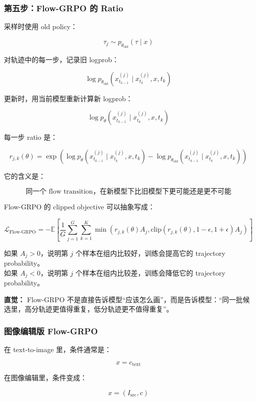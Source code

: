 \subsubsection{第五步：Flow-GRPO 的 Ratio}

采样时使用 old policy：

\[
\tau_j\sim p_{\theta_\text{old}}(\tau\mid x)
\]

对轨迹中的每一步，记录旧 logprob：

\[
\log p_{\theta_\text{old}}
\left(
x_{t_{k-1}}^{(j)}
\mid
x_{t_k}^{(j)},x,t_k
\right)
\]

更新时，用当前模型重新计算新 logprob：

\[
\log p_\theta
\left(
x_{t_{k-1}}^{(j)}
\mid
x_{t_k}^{(j)},x,t_k
\right)
\]

每一步 ratio 是：

\[
r_{j,k}(\theta)
=
\exp
\left(
\log p_\theta
\left(
x_{t_{k-1}}^{(j)}
\mid
x_{t_k}^{(j)},x,t_k
\right)
-
\log p_{\theta_\text{old}}
\left(
x_{t_{k-1}}^{(j)}
\mid
x_{t_k}^{(j)},x,t_k
\right)
\right)
\]

它的含义是：

\[
\text{同一个 flow transition，在新模型下比旧模型下更可能还是更不可能}
\]

Flow-GRPO 的 clipped objective 可以抽象写成：

\[
\mathcal{L}_\text{Flow-GRPO}
=
-
\mathbb{E}
\left[
\frac{1}{G}
\sum_{j=1}^{G}
\sum_{k=1}^{K}
\min
\left(
r_{j,k}(\theta)A_j,
\text{clip}(r_{j,k}(\theta),1-\epsilon,1+\epsilon)A_j
\right)
\right]
\]

如果 $A_j>0$，说明第 $j$ 个样本在组内比较好，训练会提高它的 trajectory probability。\\
如果 $A_j<0$，说明第 $j$ 个样本在组内比较差，训练会降低它的 trajectory probability。

\begin{intubox}
\textbf{直觉：} Flow-GRPO 不是直接告诉模型“应该怎么画”，而是告诉模型：“同一批候选里，高分轨迹更值得重复，低分轨迹更不值得重复”。
\end{intubox}

\subsubsection{图像编辑版 Flow-GRPO}

在 text-to-image 里，条件通常是：

\[
x=c_\text{text}
\]

在图像编辑里，条件变成：

\[
x=(I_\text{src},c)
\]

